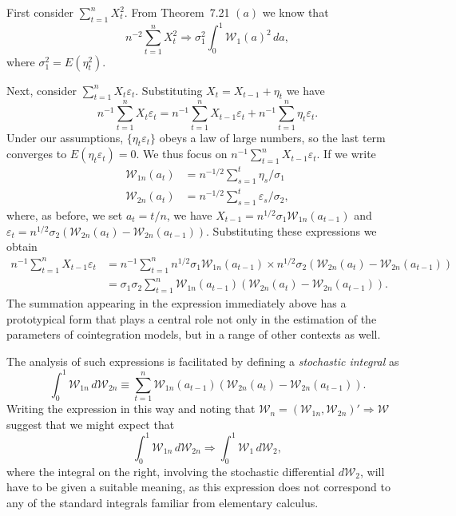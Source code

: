 First consider $\sum_{t=1}^{n} X_t^2$. From Theorem~7.21 $(a)$ we know that
\[
n^{-2}\sum_{t=1}^{n} X_t^2 \Rightarrow \sigma_1^2 \int_0^1 \mathcal{W}_1(a)^2\,da,
\]
where $\sigma_1^2 = E(\eta_t^2)$.

Next, consider $\sum_{t=1}^{n} X_t \varepsilon_t$. Substituting $X_t = X_{t-1} + \eta_t$ we have
\[
n^{-1}\sum_{t=1}^{n} X_t \varepsilon_t = n^{-1}\sum_{t=1}^{n} X_{t-1}\varepsilon_t + n^{-1}\sum_{t=1}^{n} \eta_t \varepsilon_t.
\]
Under our assumptions, $\{\eta_t \varepsilon_t\}$ obeys a law of large numbers, so the last term converges to $E(\eta_t \varepsilon_t) = 0$. We thus focus on $n^{-1}\sum_{t=1}^{n} X_{t-1}\varepsilon_t$. If we write
\begin{align*}
\mathcal{W}_{1n}(a_t) &= n^{-1/2}\sum_{s=1}^{t} \eta_s / \sigma_1 \\
\mathcal{W}_{2n}(a_t) &= n^{-1/2}\sum_{s=1}^{t} \varepsilon_s / \sigma_2,
\end{align*}
where, as before, we set $a_t = t/n$, we have $X_{t-1} = n^{1/2}\sigma_1 \mathcal{W}_{1n}(a_{t-1})$ and $\varepsilon_t = n^{1/2}\sigma_2\left(\mathcal{W}_{2n}(a_t) - \mathcal{W}_{2n}(a_{t-1})\right)$. Substituting these expressions we obtain
\begin{align*}
n^{-1}\sum_{t=1}^{n} X_{t-1}\varepsilon_t &= n^{-1}\sum_{t=1}^{n} n^{1/2}\sigma_1 \mathcal{W}_{1n}(a_{t-1}) \times n^{1/2}\sigma_2 \left(\mathcal{W}_{2n}(a_t) - \mathcal{W}_{2n}(a_{t-1})\right) \\
&= \sigma_1 \sigma_2 \sum_{t=1}^{n} \mathcal{W}_{1n}(a_{t-1})\left(\mathcal{W}_{2n}(a_t) - \mathcal{W}_{2n}(a_{t-1})\right).
\end{align*}
The summation appearing in the expression immediately above has a prototypical form that plays a central role not only in the estimation of the parameters of cointegration models, but in a range of other contexts as well.

The analysis of such expressions is facilitated by defining a \emph{stochastic integral} as
\[
\int_0^1 \mathcal{W}_{1n}\,d\mathcal{W}_{2n} \equiv \sum_{t=1}^{n} \mathcal{W}_{1n}(a_{t-1})\left(\mathcal{W}_{2n}(a_t) - \mathcal{W}_{2n}(a_{t-1})\right).
\]
Writing the expression in this way and noting that $\boldsymbol{\mathcal{W}}_n = (\mathcal{W}_{1n}, \mathcal{W}_{2n})' \Rightarrow \boldsymbol{\mathcal{W}}$ suggest that we might expect that
\[
\int_0^1 \mathcal{W}_{1n}\,d\mathcal{W}_{2n} \Rightarrow \int_0^1 \mathcal{W}_1\,d\mathcal{W}_2,
\]
where the integral on the right, involving the stochastic differential $d\mathcal{W}_2$, will have to be given a suitable meaning, as this expression does not correspond to any of the standard integrals familiar from elementary calculus.

